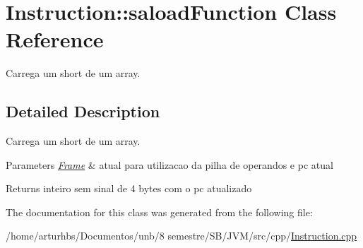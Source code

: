 \hypertarget{classInstruction_1_1saloadFunction}{}\section{Instruction\+:\+:saload\+Function Class Reference}
\label{classInstruction_1_1saloadFunction}


Carrega um short de um array.  




\subsection{Detailed Description}
Carrega um short de um array. 


\begin{DoxyParams}{Parameters}
{\em \hyperlink{classFrame}{Frame}} & atual para utilizacao da pilha de operandos e pc atual \\
\hline
\end{DoxyParams}
\begin{DoxyReturn}{Returns}
inteiro sem sinal de 4 bytes com o pc atualizado 
\end{DoxyReturn}


The documentation for this class was generated from the following file\+:\begin{DoxyCompactItemize}
\item 
/home/arturhbs/\+Documentos/unb/8 semestre/\+S\+B/\+J\+V\+M/src/cpp/\hyperlink{Instruction_8cpp}{Instruction.\+cpp}\end{DoxyCompactItemize}
